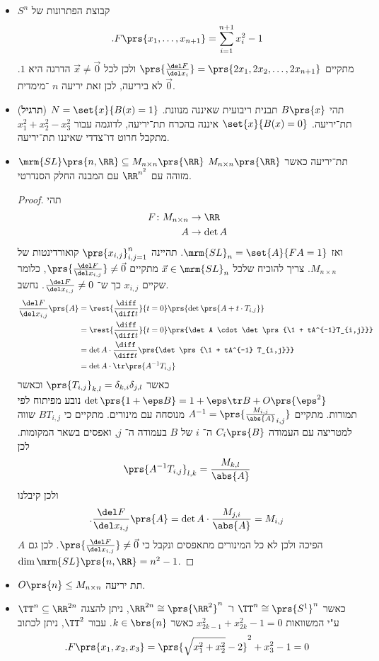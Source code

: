 \documentclass[a4paper,10pt,twoside,openany]{book}
\begin{document}
\begin{examples}
\begin{itemize}
\item $S^n$
קבוצת הפתרונות של
\[\text{.} F\prs{x_1, \ldots, x_{n+1}} = \sum_{i=1}^{n+1} x_i^2 - 1\]
מתקיים
$\prs{\frac{\del F}{\del x_i}} = \prs{2x_1, 2x_2, \ldots, 2x_{n+1}}$
ולכן
לכל
$\vec{x} \neq \vec{0}$
הדרגה היא
$1$.
$\vec{0}$
לא ביריעה, לכן זאת יריעה
$n$%
־מימדית.
\item (\textbf{תרגיל})
תהי
$B\prs{x}$
תבנית ריבועית שאיננה מנוונת.
$N = \set{x}{B(x) = 1}$
תת־יריעה.
$\set{x}{B(x) = 0}$
איננה בהכרח תת־יריעה, לדוגמה עבור
$x_1^2 + x_2^2 - x_3^2$
מתקבל חרוט דו־צדדי שאיננו תת־יריעה.
\item $\mrm{SL}\prs{n,\RR} \subseteq M_{n\times n}\prs{\RR}$
תת־יריעה כאשר
$M_{n\times n}\prs{\RR}$
מזוהה עם
$\RR^{n^2}$
עם המבנה החלק הסנדרטי.
\begin{proof}
תהי
\begin{align*}
F \colon M_{n\times n} &\to \RR \\
A &\to \det A
\end{align*}
ואז
$\mrm{SL}_n = \set{A}{FA = 1}$.
תהיינה
$\prs{x_{i,j}}_{i,j=1}^n$
קואורדינטות של
$M_{n\times n}$.
צריך להוכיח שלכל
$\vec{x} \in \mrm{SL}_n$
מתקיים
$\prs{\frac{\del F}{\del x_{i,j}}} \neq \vec{0}$,
כלומר שקיים
$x_{i,j}$
כך ש־%
$\frac{\del F}{\del x_{i,j}} \neq 0$.
נחשב.
\begin{align*}
\frac{\del F}{\del x_{i,j}} \prs{A} &= \rest{\frac{\diff}{\diff t}}{t=0} \prs{\det \prs{A + t\cdot T_{i,j}}} \\ &= \rest{\frac{\diff}{\diff t}}{t=0}\prs{\det A \cdot \det\prs{\1 + tA^{-1}T_{i,j}}} \\
&= \det A \cdot \frac{\diff}{\diff t}\prs{\det \prs{\1 + tA^{-1} T_{i,j}}} \\
&= \det A \cdot \tr \prs{A^{-1} T_{i,j}}
\end{align*}
כאשר
$\prs{T_{i,j}}_{k,l} = \delta_{k,i} \delta_{j,l}$
וכאשר
$\det\prs{1+\eps B} = 1 + \eps \tr B + O\prs{\eps^2}$
נובע מפיתוח לפי תמורות.
מתקיים
$A^{-1} = \prs{\frac{M_{i,j}}{\abs{A}}_{i,j}}$
מנוסחה עם מינורים.
מתקיים כי
$B T_{i,j}$
שווה למטריצה עם העמודה
$C_i\prs{B}$
ה־%
$i$
של
$B$
בעמודה ה־%
$j$,
ואפסים בשאר המקומות.
לכן
\[\prs{A^{-1}T_{i,j}}_{l,k} = \frac{M_{k,l}}{\abs{A}}\]
ולכן
קיבלנו
\[\text{.}\frac{\del F}{\del x_{i,j}}\prs{A} = \det A \cdot \frac{M_{j,i}}{\abs{A}} = M_{i,j}\]
$A$
הפיכה ולכן לא כל המינורים מתאפסים ונקבל כי
$\prs{\frac{\del F}{\del x_{i,j}}} \neq \vec{0}$.
לכן גם
$\dim \mrm{SL}\prs{n,\RR} = n^2 - 1$.
\end{proof}
\item \begin{exercise}
$O\prs{n} \leq M_{n\times n}$
תת יריעה.
\end{exercise}
\item $\TT^n \subseteq \RR^{2n}$
כאשר
$\TT^n \cong \prs{S^1}^n$
ו־%
$\RR^{2n} \cong \prs{\RR^2}^n$,
ניתן להצגה ע"י המשוואות
$x_{2k-1}^2 + x_{2k}^2 - 1 = 0$
כאשר
$k \in \brs{n}$.
עבור
$\TT^2$,
ניתן לכתוב
\[\text{.} F\prs{x_1, x_2, x_3} = \prs{\sqrt{x_1^2 + x_2^2} - 2}^2 + x_3^2 - 1 = 0\]
\end{itemize}
\end{examples}
\end{document}
